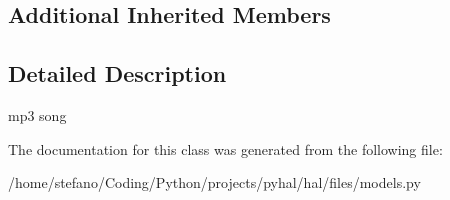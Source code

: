 \subsection*{Additional Inherited Members}


\subsection{Detailed Description}
\begin{DoxyVerb}mp3 song \end{DoxyVerb}
 

The documentation for this class was generated from the following file\+:\begin{DoxyCompactItemize}
\item 
/home/stefano/\+Coding/\+Python/projects/pyhal/hal/files/models.\+py\end{DoxyCompactItemize}

